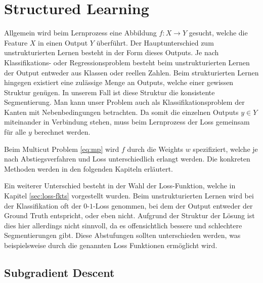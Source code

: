 \section{Structured Learning}\label{sec:strucLearn}

Allgemein wird beim Lernprozess eine Abbildung $f: X \rightarrow Y$ gesucht, welche die Feature $X$ in einen Output $Y$ überführt. Der Hauptunterschied zum unstrukturierten Lernen besteht in der Form dieses Outputs. Je nach Klassifikations- oder Regressionsproblem besteht beim unstrukturierten Lernen der Output entweder aus Klassen oder reellen Zahlen. Beim strukturierten Lernen hingegen existiert eine zulässige Menge an Outputs, welche einer gewissen Struktur genügen. In unserem Fall ist diese Struktur die konsistente Segmentierung. Man kann unser Problem auch als Klassifikationsproblem der Kanten mit Nebenbedingungen betrachten. Da somit die einzelnen Outputs $y \in Y$ miteinander in Verbindung stehen, muss beim Lernprozess der Loss gemeinsam für alle $y$ berechnet werden.

Beim Multicut Problem \eqref{eq:mp} wird $f$ durch die Weights $w$ spezifiziert, welche je nach Abstiegsverfahren und Loss unterschiedlich erlangt werden. Die konkreten Methoden werden in den folgenden Kapiteln erläutert. 

Ein weiterer Unterschied besteht in der Wahl der Loss-Funktion, welche in Kapitel \ref{sec:loss-fkts} vorgestellt wurden. Beim unstrukturierten Lernen wird bei der Klassifikation oft der $0$-$1$-Loss genommen, bei dem der Output entweder der Ground Truth entspricht, oder eben nicht. Aufgrund der Struktur der Lösung ist dies hier allerdings nicht sinnvoll, da es offensichtlich bessere und schlechtere Segmentierungen gibt. Diese Abstufungen sollten unterschieden werden, was beispielsweise durch die genannten Loss Funktionen ermöglicht wird.





\subsection{Subgradient Descent}

